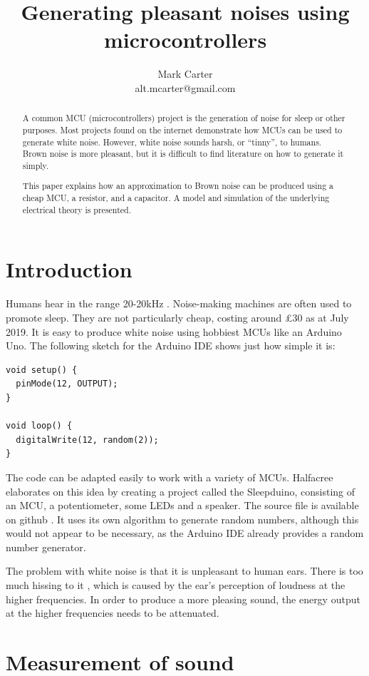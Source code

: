 \documentclass[a4paper,10pt]{article}
\title{Generating pleasant noises using microcontrollers}
\author{Mark Carter \\ alt.mcarter@gmail.com}
\begin{document}
\maketitle
\thispagestyle{fancy}

\begin{abstract}

A common MCU (microcontrollers) project is the generation of noise for sleep or other purposes. Most projects found on the internet demonstrate how MCUs can be used to generate white noise. However, white noise sounds harsh, or ``tinny'', to humans. Brown noise is more pleasant, but it is difficult to find literature on how to generate it simply.

This paper explains how an approximation to Brown noise can be produced using a cheap MCU, a resistor, and a capacitor. A model and simulation of the underlying electrical theory is presented.
\end{abstract}

\section{Introduction}
Humans hear in the range 20-20kHz \cite{wikihearing}. 
Noise-making machines are often used to promote sleep. They are not particularly cheap, costing around £30 as at July 2019. It is easy to produce white noise using hobbiest MCUs like an Arduino Uno. The following sketch for the Arduino IDE shows just how simple it is:
\begin{verbatim}
void setup() {
  pinMode(12, OUTPUT);
}

void loop() {
  digitalWrite(12, random(2));
}
\end{verbatim} 
The code can be adapted easily to work with a variety of MCUs. Halfacree \cite{halfacree} elaborates on this idea by creating a project called the Sleepduino, consisting of an MCU, a potentiometer, some LEDs and a speaker.  The source file is available on github \cite{sleepduino}. It uses its own algorithm to generate random numbers, although this would not appear to be necessary, as the Arduino IDE already provides a random number generator.

The problem with white noise is that it is unpleasant to human ears. There is too much hissing to it \cite{gulf}, which is caused by the ear's perception of loudness at the higher frequencies. In order to produce a more pleasing sound, the energy output at the higher frequencies needs to be attenuated.

\section{Measurement of sound}
\end{document}
